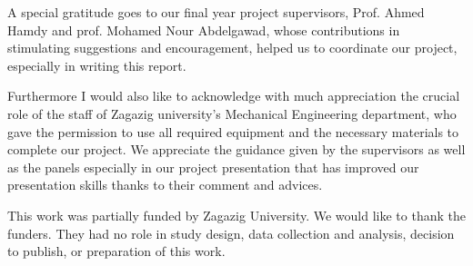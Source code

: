 A special gratitude goes to our final year project  supervisors, Prof. Ahmed Hamdy and prof. Mohamed Nour Abdelgawad, whose contributions in stimulating suggestions and encouragement,  helped us to coordinate our project, especially in writing this report.

Furthermore I would also like to acknowledge with much appreciation the crucial role of the staff of Zagazig university’s Mechanical Engineering department, who gave the permission to use all required  equipment and the necessary materials to complete our project. We appreciate the guidance given by the supervisors as well as the panels especially in our project presentation that has improved our presentation skills thanks to their comment and advices.

This work was partially funded by Zagazig University. We would like to thank the funders. They had no role in study design, data collection and analysis, decision to publish, or preparation of this work.
